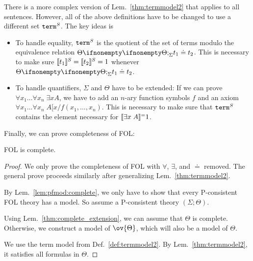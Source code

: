 \begin{remark}
There is a more complex version of Lem.~\ref{thm:termmodel2} that applies to all sentences.
However, all of the above definitions have to be changed to use a different set $\mathtt{term}^S$.
The key ideas is
 \begin{itemize}
   \item To handle equality, $\mathtt{term}^S$ is the quotient of the set of terms modulo the equivalence relation $\iscons{\Sigma}{\Theta}{}{t_1\doteq t_2}$.
   This is necessary to make sure $\llbracket t_1\rrbracket^{S}=\llbracket t_2\rrbracket^{S}=1$ whenever $\iscons{\Sigma}{\Theta}{}{t_1\doteq t_2}$.
   \item To handle quantifiers, $\Sigma$ and $\Theta$ have to be extended: If we can prove $\forall x_1\ldots\forall x_n\;\exists x A$, we have to add an $n$-ary function symbols $f$ and an axiom $\forall x_1\ldots\forall x_n\;A[x/f(x_1,\ldots,x_n)$.
    This is necessary to make sure that $\mathtt{term}^S$ contains the element necessary for $\llbracket \exists x \;A\rrbracket^{=}1$.
 \end{itemize}

\end{remark}

Finally, we can prove completeness of FOL:

\begin{theorem}
FOL is complete.
\end{theorem}
\begin{proof}
We only prove the completeness of FOL with $\forall$, $\exists$, and $\doteq$ removed.
The general prove proceeds similarly after generalizing Lem.~\ref{thm:termmodel2}.

By Lem.~\ref{lem:pfmod:complete}, we only have to show that every P-consistent FOL theory has a model.
So assume a P-consistent theory $(\Sigma;\Theta)$.

Using Lem.~\ref{thm:complete_extension}, we can assume that $\Theta$ is complete.
Otherwise, we construct a model of $\ov{\Theta}$, which will also be a model of $\Theta$.

We use the term model from Def.~\ref{def:termmodel2}.
By Lem.~\ref{thm:termmodel2}, it satisfies all formulas in $\Theta$.
\end{proof}

